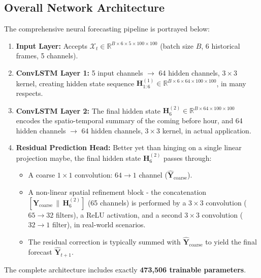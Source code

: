 \documentclass[conference]{IEEEtran}
\begin{document}
\subsection{Overall Network Architecture}
The comprehensive neural forecasting pipeline is portrayed below:
\begin{enumerate}
    \item \textbf{Input Layer:} Accepts $\boldsymbol{\mathcal{X}}_t \in \mathbb{R}^{B \times 6 \times 5 \times 100 \times 100}$ (batch size $B$, 6 historical frames, 5 channels).
    \item \textbf{ConvLSTM Layer 1:} 5 input channels $\rightarrow$ 64 hidden channels, $3 \times 3$ kernel, creating hidden state sequence $\mathbf{H}^{(1)}_{1:6} \in \mathbb{R}^{B \times 6 \times 64 \times 100 \times 100}$, in many respects.
    \item \textbf{ConvLSTM Layer 2:} The final hidden state $\mathbf{H}^{(2)}_6 \in \mathbb{R}^{B \times 64 \times 100 \times 100}$ encodes the spatio-temporal summary of the coming before hour, and 64 hidden channels $\rightarrow$ 64 hidden channels, $3 \times 3$ kernel, in actual application.
    \item \textbf{Residual Prediction Head:} Better yet than hinging on a single linear projection maybe, the final hidden state $\mathbf{H}^{(2)}_6$ passes through:
    \begin{itemize}
        \item A coarse $1 \times 1$ convolution: $64 \rightarrow 1$ channel ($\hat{\mathbf{Y}}_{\text{coarse}}$).
        \item A non-linear spatial refinement block - the concatenation $[\hat{\mathbf{Y}}_{\text{coarse}} \,\|\, \mathbf{H}^{(2)}_6]$ (65 channels) is performed by a $3 \times 3$ convolution ($65 \rightarrow 32$ filters), a ReLU activation, and a second $3 \times 3$ convolution ($32 \rightarrow 1$ filter), in real-world scenarios.
        \item The residual correction is typically summed with $\hat{\mathbf{Y}}_{\text{coarse}}$ to yield the final forecast $\hat{\mathbf{Y}}_{t+1}$.
    \end{itemize}
\end{enumerate}
The complete architecture includes exactly \textbf{473,506 trainable parameters}.
\end{document}
